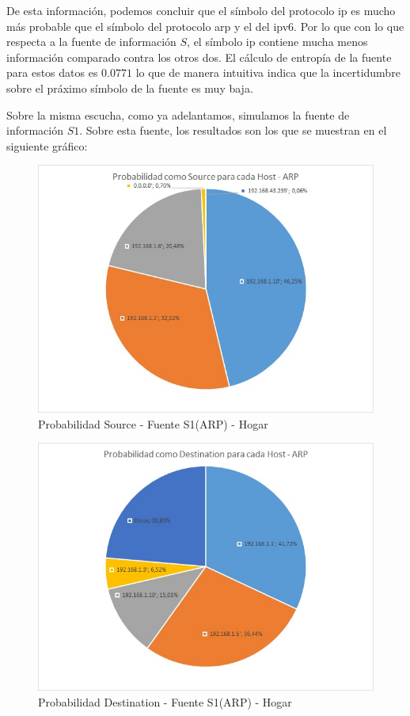 De esta información, podemos concluir que el símbolo del protocolo ip es mucho más probable que el símbolo del protocolo arp y el del ipv6. Por lo que con lo que respecta a la fuente de información $S$, el símbolo ip contiene mucha menos información comparado contra los otros dos. El cálculo de entropía de la fuente para estos datos es $0.0771$ lo que de manera intuitiva indica que la incertidumbre sobre el práximo símbolo de la fuente es muy baja.

Sobre la misma escucha, como ya adelantamos, simulamos la fuente de información $S1$. Sobre esta fuente, los resultados son los que se muestran en el siguiente gráfico:

\begin{figure}[h!]
\centering
\includegraphics[width=\textwidth]{./img/proba_src_casa.jpg}
\caption{Probabilidad Source - Fuente S1(ARP) - Hogar}
\end{figure}

\begin{figure}[h!]
\centering
\includegraphics[width=\textwidth]{./img/proba_dst_casa.jpg}
\caption{Probabilidad Destination - Fuente S1(ARP) - Hogar}
\end{figure}
\newpage

